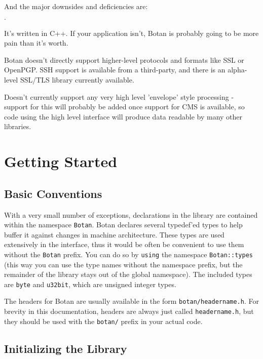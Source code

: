 \documentclass{article}
\newcommand{\filename}[1]{\texttt{#1}}
\newcommand{\keyword}[1]{\texttt{#1}}
\newcommand{\type}[1]{\texttt{#1}}
\newcommand{\namespace}[1]{\texttt{#1}}
\begin{document}
\noindent
And the major downsides and deficiencies are:

\begin{list}{$\cdot$}
  \item It's written in C++. If your application isn't, Botan is probably
        going to be more pain than it's worth.
  \item

  \item Botan doesn't directly support higher-level protocols and
        formats like SSL or OpenPGP. SSH support is available from a
        third-party, and there is an alpha-level SSL/TLS library
        currently available.

  \item Doesn't currently support any very high level 'envelope' style
        processing - support for this will probably be added once support for
        CMS is available, so code using the high level interface will produce
        data readable by many other libraries.
\end{list}

\pagebreak
\section{Getting Started}

\subsection{Basic Conventions}

With a very small number of exceptions, declarations in the library
are contained within the namespace \namespace{Botan}. Botan declares
several typedef'ed types to help buffer it against changes in machine
architecture.  These types are used extensively in the interface,
thus it would be often be convenient to use them without the
\namespace{Botan} prefix. You can do so by \keyword{using} the
namespace \namespace{Botan::types} (this way you can use the type
names without the namespace prefix, but the remainder of the library
stays out of the global namespace). The included types are \type{byte}
and \type{u32bit}, which are unsigned integer types.

The headers for Botan are usually available in the form
\filename{botan/headername.h}. For brevity in this documentation,
headers are always just called \filename{headername.h}, but they
should be used with the \filename{botan/} prefix in your actual code.

\subsection{Initializing the Library}
\end{document}
